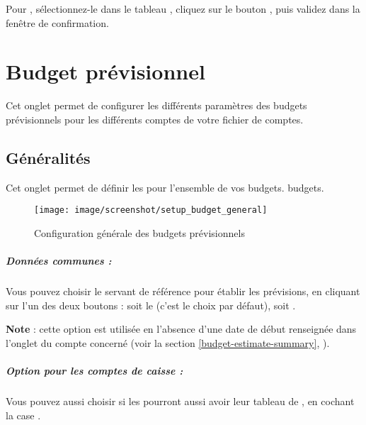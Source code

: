 Pour , sélectionnez-le dans le tableau  , cliquez sur le bouton , puis validez dans la fenêtre de confirmation.



\section{Budget prévisionnel\label{setup-budget}}


Cet onglet permet de configurer les différents paramètres des budgets prévisionnels pour les différents comptes de votre fichier de comptes.


\subsection{Généralités\label{setup-budget-general}}

Cet onglet permet de définir les  pour l'ensemble de vos \ifIllustration  budgets.
\else budgets. 
\fi

\ifIllustration
\begin{figure}[h!]
\begin{center}
\texttt{[image: image/screenshot/setup\_budget\_general]}
\end{center}
\caption{Configuration générale des budgets prévisionnels}
\label{setup-budgetGeneral-img}
\end{figure}
\fi

\subparagraph{Données communes :\label{setup-budget-general-common}}

Vous pouvez choisir le  servant de référence pour établir les prévisions, en cliquant sur l'un des deux boutons : soit le  (c'est le choix par défaut), soit . 

\textbf{Note} : cette option est utilisée en l'absence d'une date de début renseignée dans l'onglet  du compte concerné (voir la section \vref{budget-estimate-summary}, ).

\subparagraph{Option pour les comptes de caisse :\label{setup-budget-general-cash}}

Vous pouvez aussi choisir si les  pourront aussi avoir leur tableau de , en cochant la case .



